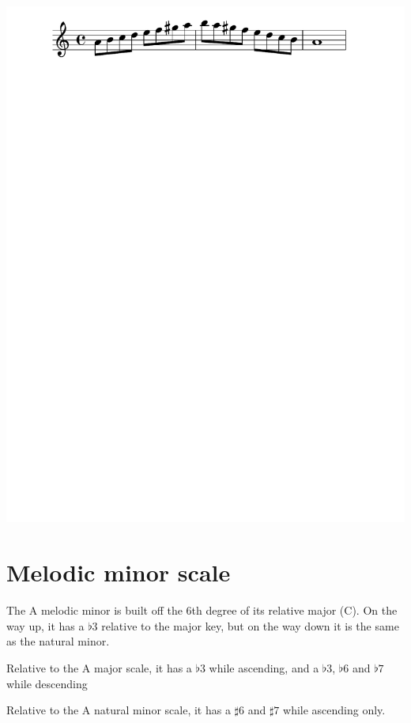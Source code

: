 \documentclass[11pt]{article}
\begin{document}
\begin{center}
\includegraphics[width=.9\linewidth]{a_harmonic_minor.pdf}
\end{center}

\section*{Melodic minor scale}
\label{sec:orgb64b729}

The A melodic minor is built off the 6th degree of its relative major (C).
On the way up, it has a \(\flat{3}\) relative to the major key, but on the way down it is the same as the natural minor.

Relative to the A major scale, it has a \(\flat{3}\) while ascending, and a \(\flat{3}\), \(\flat{6}\)  and \(\flat{7}\) while descending

Relative to the A natural minor scale, it has a \(\sharp{6}\) and \(\sharp{7}\) while ascending only.
\end{document}
